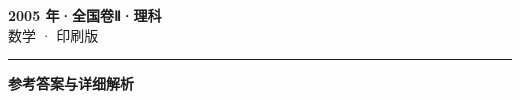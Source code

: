 \documentclass[zihao=5, a4paper]{ctexart}
\begin{document}
\begin{center}
  {\Large\bfseries 2005 年·全国卷Ⅱ·理科}\\[4pt]
  {\large 数学 · 印刷版}
\end{center}
\medskip
{}

\par\bigskip\hrule\bigskip
{}
\begin{center}{\large\bfseries 参考答案与详细解析}\end{center}
\smallskip

\end{document}
